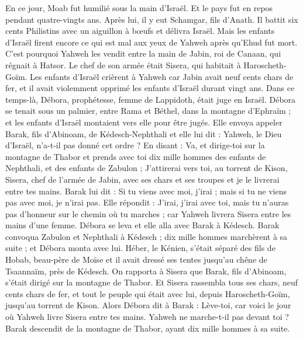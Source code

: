 \begin{multicols}{2}
En ce jour, Moab fut humilié sous la main d'Israël. Et le pays fut en repos pendant quatre-vingts ans.
Après lui, il y eut Schamgar, fils d'Anath. Il battit six cents Philistins avec un aiguillon à bœufs et délivra Israël.
\VerseOne{}Mais les enfants d'Israël firent encore ce qui est mal aux yeux de Yahweh après qu'Ehud fut mort.
C'est pourquoi Yahweh les vendit entre la main de Jabin, roi de Canaan, qui régnait à Hatsor. Le chef de son armée était Sisera, qui habitait à Haroscheth-Goïm.
Les enfants d'Israël crièrent à Yahweh car Jabin avait neuf cents chars de fer, et il avait violemment opprimé les enfants d'Israël durant vingt ans.
Dans ce temps-là, Débora, prophétesse, femme de Lappidoth, était juge en Israël.
Débora se tenait sous un palmier, entre Rama et Béthel, dans la montagne d'Ephraïm ; et les enfants d'Israël montaient vers elle pour être jugés.
Elle envoya appeler Barak, fils d'Abinoam, de Kédesch-Nephthali et elle lui dit : Yahweh, le Dieu d'Israël, n'a-t-il pas donné cet ordre ? En disant : Va, et dirige-toi sur la montagne de Thabor et prends avec toi dix mille hommes des enfants de Nephthali, et des enfants de Zabulon ;
J'attirerai vers toi, au torrent de Kison, Sisera, chef de l'armée de Jabin, avec ses chars et ses troupes et je le livrerai entre tes mains.
Barak lui dit : Si tu viens avec moi, j'irai ; mais si tu ne viens pas avec moi, je n'irai pas.
Elle répondit : J'irai, j'irai avec toi, mais tu n'auras pas d'honneur sur le chemin où tu marches ; car Yahweh livrera Sisera entre les mains d'une femme. Débora se leva et elle alla avec Barak à Kédesch.
Barak convoqua Zabulon et Nephthali à Kédesch ; dix mille hommes marchèrent à sa suite ; et Débora monta avec lui.
Héber, le Kénien, s'était séparé des fils de Hobab, beau-père de Moïse et il avait dressé ses tentes jusqu'au chêne de Tsaannaïm, près de Kédesch.
On rapporta à Sisera que Barak, fils d'Abinoam, s'était dirigé sur la montagne de Thabor.
Et Sisera rassembla tous ses chars, neuf cents chars de fer, et tout le peuple qui était avec lui, depuis Haroscheth-Goïm, jusqu'au torrent de Kison.
Alors Débora dit à Barak : Lève-toi, car voici le jour où Yahweh livre Sisera entre tes mains. Yahweh ne marche-t-il pas devant toi ? Barak descendit de la montagne de Thabor, ayant dix mille hommes à sa suite.

\end{multicols}
